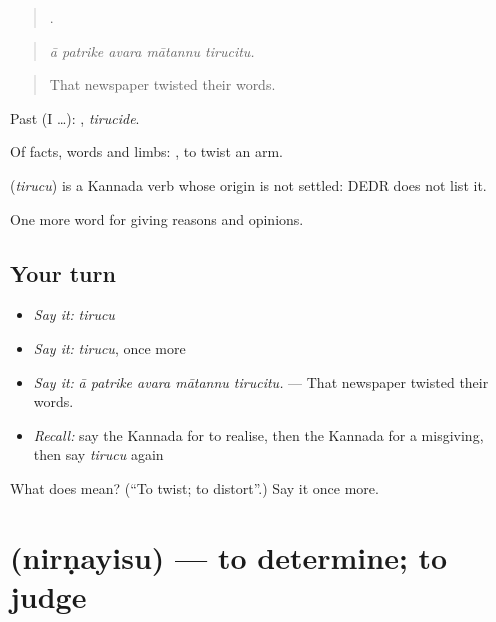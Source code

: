 \begin{quote}
    .
\end{quote}

\begin{quote}
\emph{ā patrike avara mātannu tirucitu.}
\end{quote}

\begin{quote}
That newspaper twisted their words.
\end{quote}

Past (I …): , \emph{tirucide}.

Of facts, words and limbs:  , to twist an arm.

\begin{cousinweb}
\textbf{} (\emph{tirucu}) is a Kannada verb whose origin is not settled: DEDR does not list it.
\end{cousinweb}

\begin{grammarlens}[title={What you've built}]
One more word for giving reasons and opinions.
\end{grammarlens}

\subsection*{Your turn}
\begin{itemize}
\raggedright
  \item \emph{Say it:} \emph{tirucu}
  \item \emph{Say it:} \emph{tirucu}, once more
  \item \emph{Say it:} \emph{ā patrike avara mātannu tirucitu.} — That newspaper twisted their words.
  \item \emph{Recall:} say the Kannada for to realise, then the Kannada for a misgiving, then say \emph{tirucu} again
\end{itemize}

\begin{tcolorbox}[breakable,colback=teal!4,colframe=teal!35!black,title={Before you move on}]
What does  mean? (\textquotedblleft{}To twist; to distort\textquotedblright{}.) Say it once more.
\end{tcolorbox}
\section[\texorpdfstring{\kn{ನಿರ್ಣಯಿಸು} (nirṇayisu)}{ನಿರ್ಣಯಿಸು (nirṇayisu)}]{ (nirṇayisu) — to determine; to judge}

